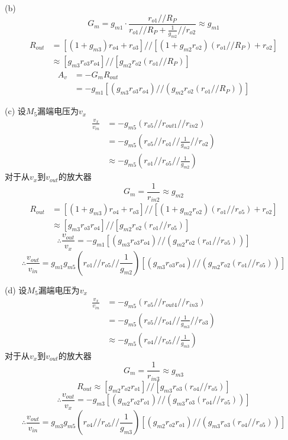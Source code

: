 \documentclass[hyperref, UTF8]{ctexart}
\newcommand{\under}[1]{\frac{1}{#1}}
\begin{document}
    (b) $$G_m = g_{m1} \cdot \frac{r_{o1}//R_P}{r_{o1}//R_P+\under{g_{m2}}//r_{o2}} \approx g_{m1}$$
    \begin{align*}
        R_{out} &= [(1+g_{m3})r_{o4}+r_{o3}]//[(1+g_{m2}r_{o2})(r_{o1}//R_P)+r_{o2}] \\
        & \approx [g_{m3}r_{o3}r_{o4}] // [g_{m2}r_{o2}(r_{o1}//R_P)] 
    \end{align*}
    \begin{align*}
        A_v &= -G_mR_{out} \\
        &= -g_{m1}[(g_{m3}r_{o3}r_{o4}) // (g_{m2}r_{o2}(r_{o1}//R_P))]
    \end{align*}

    (c) 设$M_5$漏端电压为$v_x$
    \begin{align*}
        \frac{v_x}{v_{in}} &= -g_{m5}(r_{o5}//r_{out1}//r_{in2}) \\
        &= -g_{m5}(r_{o5}//r_{o1}//\under{g_{m2}}//r_{o2}) \\
        &\approx -g_{m5}(r_{o1}//r_{o5}//\under{g_{m2}})
    \end{align*}
    对于从$v_x$到$v_{out}$的放大器
    $$G_m = \under{r_{in2}} \approx g_{m2} $$
    \begin{align*}
        R_{out} &= [(1+g_{m3})r_{o4}+r_{o3}]//[(1+g_{m2}r_{o2})(r_{o1}//r_{o5})+r_{o2}] \\
        & \approx [g_{m3}r_{o3}r_{o4}] // [g_{m2}r_{o2}(r_{o1}//r_{o5})] 
    \end{align*}
    $$\therefore \frac{v_{out}}{v_{x}} = -g_{m1}[(g_{m3}r_{o3}r_{o4}) // (g_{m2}r_{o2}(r_{o1}//r_{o5}))]$$
    $$\therefore \frac{v_{out}}{v_{in}} = g_{m1}g_{m5}(r_{o1}//r_{o5}//\under{g_{m2}})[(g_{m3}r_{o3}r_{o4}) // (g_{m2}r_{o2}(r_{o1}//r_{o5}))]$$

    (d) 设$M_5$漏端电压为$v_x$
    \begin{align*}
        \frac{v_x}{v_{in}} &= -g_{m5}(r_{o5}//r_{out4}//r_{in3}) \\
        &= -g_{m5}(r_{o5}//r_{o4}//\under{g_{m3}}//r_{o3}) \\
        &\approx -g_{m5}(r_{o4}//r_{o5}//\under{g_{m3}})
    \end{align*}
    对于从$v_x$到$v_{out}$的放大器
    $$G_m = \under{r_{in3}} \approx g_{m3} $$
    $$R_{out}\approx [g_{m2}r_{o2}r_{o1}] // [g_{m3}r_{o3}(r_{o4}//r_{o5})] $$
    $$\therefore \frac{v_{out}}{v_{x}} = -g_{m3}[(g_{m2}r_{o2}r_{o1}) // (g_{m3}r_{o3}(r_{o4}//r_{o5}))]$$
    $$\therefore \frac{v_{out}}{v_{in}} = g_{m3}g_{m5}(r_{o4}//r_{o5}//\under{g_{m3}})[(g_{m2}r_{o2}r_{o1}) // (g_{m3}r_{o3}(r_{o4}//r_{o5}))]$$
\end{document}

